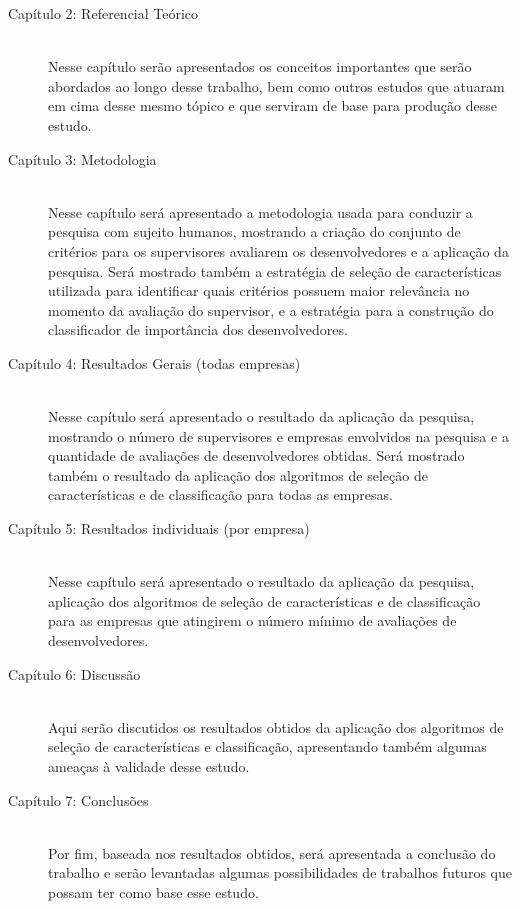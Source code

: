 \begin{description}
	\item[Capítulo 2: Referencial Teórico] \hfill \\
	Nesse capítulo serão apresentados os conceitos importantes que serão abordados ao longo desse trabalho, bem como outros estudos que atuaram em cima desse mesmo tópico e que serviram de base para produção desse estudo.
	
	\item [Capítulo 3: Metodologia] \hfill \\
	Nesse capítulo será apresentado a metodologia usada para conduzir a pesquisa com sujeito humanos, mostrando a criação do conjunto de critérios para os supervisores avaliarem os desenvolvedores e a aplicação da pesquisa. Será mostrado também a estratégia de seleção de características utilizada para identificar quais critérios possuem maior relevância no momento da avaliação do supervisor, e a estratégia para a construção do classificador de importância dos desenvolvedores.
	
	\item[Capítulo 4: Resultados Gerais (todas empresas) ] \hfill \\
	Nesse capítulo será apresentado o resultado da aplicação da pesquisa, mostrando o número de supervisores e empresas envolvidos na pesquisa e a quantidade de avaliações de desenvolvedores obtidas. Será mostrado também o resultado da aplicação dos algoritmos de seleção de características e de classificação para todas as empresas.
	
	\item[Capítulo 5: Resultados individuais (por empresa) ] \hfill \\
	Nesse capítulo será apresentado o resultado da aplicação da pesquisa, aplicação dos algoritmos de seleção de características e de classificação para as empresas que atingirem o número mínimo de avaliações de desenvolvedores.
	
	\item[Capítulo 6: Discussão ] \hfill \\
	Aqui serão discutidos os resultados obtidos da aplicação dos algoritmos de seleção de características e classificação, apresentando também algumas ameaças à validade desse estudo.
	
	\item[Capítulo 7: Conclusões ] \hfill \\
	Por fim, baseada nos resultados obtidos, será apresentada a conclusão do trabalho e serão levantadas algumas possibilidades de trabalhos futuros que possam ter como base esse estudo.
	
\end{description}

